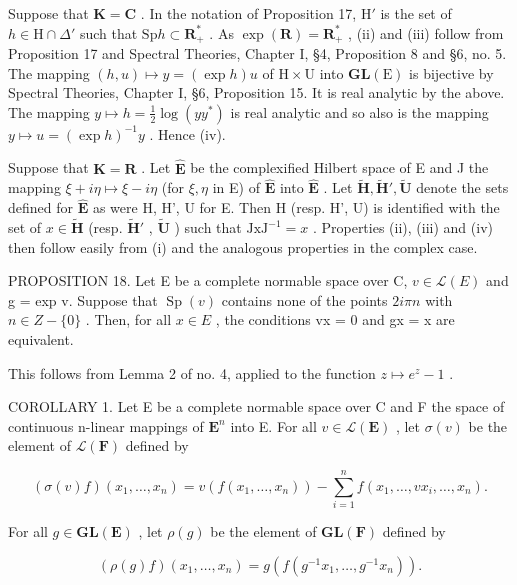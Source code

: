 Suppose that \(\mathbf{K} = \mathbf{C}\) . In the notation of Proposition 17, \(\mathrm{H}'\) is the set of \(h \in \mathrm{H} \cap \Delta'\) such that \(\mathrm{Sp} h \subset \mathbf{R}_{+}^{*}\) . As \(\exp(\mathbf{R}) = \mathbf{R}_{+}^{*}\) , (ii) and (iii) follow from Proposition 17 and Spectral Theories, Chapter I, §4, Proposition 8 and §6, no. 5. The mapping \((h, u) \mapsto y = (\exp h)u\) of \(\mathrm{H} \times \mathrm{U}\) into \(\mathbf{GL}(\mathrm{E})\) is bijective by Spectral Theories, Chapter I, §6, Proposition 15. It is real analytic by the above. The mapping \(y \mapsto h = \frac{1}{2} \log(yy^*)\) is real analytic and so also is the mapping \(y \mapsto u = (\exp h)^{-1}y\) . Hence (iv).

Suppose that \(\mathbf{K} = \mathbf{R}\) . Let \(\hat{\mathbf{E}}\) be the complexified Hilbert space of E and J the mapping \(\xi + i\eta \mapsto \xi - i\eta\) (for \(\xi, \eta\) in E) of \(\hat{\mathbf{E}}\) into \(\hat{\mathbf{E}}\) . Let \(\tilde{\mathbf{H}}, \tilde{\mathbf{H}}', \tilde{\mathbf{U}}\) denote the sets defined for \(\hat{\mathbf{E}}\) as were H, H', U for E. Then H (resp. H', U) is identified with the set of \(x \in \tilde{\mathbf{H}}\) (resp. \(\tilde{\mathbf{H}}'\) , \(\tilde{\mathbf{U}}\) ) such that \(\mathrm{JxJ}^{-1} = x\) . Properties (ii), (iii) and (iv) then follow easily from (i) and the analogous properties in the complex case.

PROPOSITION 18. Let E be a complete normable space over C, \(v \in \mathcal{L}(E)\) and g = exp v. Suppose that \(\operatorname{Sp}(v)\) contains none of the points \(2i\pi n\) with \(n \in Z - \{0\}\) . Then, for all \(x \in E\) , the conditions vx = 0 and gx = x are equivalent.

This follows from Lemma 2 of no. 4, applied to the function \(z \mapsto e^z - 1\) .

COROLLARY 1. Let E be a complete normable space over C and F the space of continuous n-linear mappings of \(\mathbf{E}^n\) into E. For all \(v \in \mathcal{L}(\mathbf{E})\) , let \(\sigma(v)\) be the element of \(\mathcal{L}(\mathbf{F})\) defined by

\[
(\sigma (v) f) (x _ {1}, \dots , x _ {n}) = v (f (x _ {1}, \dots , x _ {n})) - \sum_ {i = 1} ^ {n} f (x _ {1}, \dots , v x _ {i}, \dots , x _ {n}).
\]

For all \(g \in \mathbf{GL}(\mathbf{E})\) , let \(\rho(g)\) be the element of \(\mathbf{GL}(\mathbf{F})\) defined by

\[
(\rho (g) f) (x _ {1}, \dots , x _ {n}) = g (f (g ^ {- 1} x _ {1}, \dots , g ^ {- 1} x _ {n})).
\]

